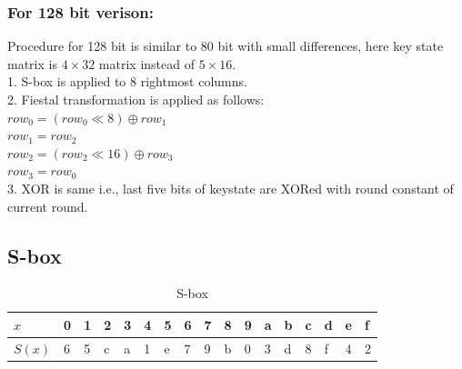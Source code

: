 \documentclass[final]{transcrypto}
\begin{document}
\subsubsection{For 128 bit verison:}
Procedure for 128 bit is similar to 80 bit with small differences, here key state matrix is $4\times 32$ matrix instead of $5\times 16$.\\
1. S-box is applied to 8 rightmost columns.\\
2. Fiestal transformation is applied as follows:\\
$row_0 = (row_0\ll 8)\oplus row_1$\\
$row_1 = row_2$\\
$row_2 = (row_2\ll 16)\oplus row_3$\\
$row_3 = row_0$\\
3. XOR is same i.e., last five bits of keystate are XORed with round constant of current round.
\subsection{S-box}
\begin{table}[H]
	\centering
	\caption{S-box}
	\begin{tabular}{|l|l|l|l|l|l|l|l|l|l|l|l|l|l|l|l|l|}
		\hline
 $x$&0&1&2&3&4&5&6&7&8&9&a&b&c&d&e&f\\ \hline
$S(x)$&6&5&c&a&1&e&7&9&b&0&3&d&8&f&4&2 \\ \hline

	\end{tabular}
\end{table}
\end{document}
